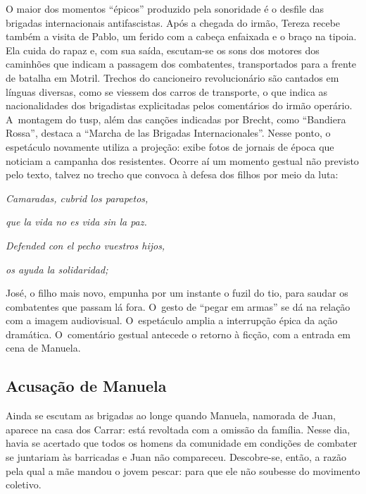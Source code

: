 O maior dos momentos “épicos” produzido pela sonoridade é o desfile das
brigadas internacionais antifascistas. Após a chegada do irmão, Tereza
recebe também a visita de Pablo, um ferido com a cabeça enfaixada e o
braço na tipoia. Ela cuida do rapaz e, com sua saída, escutam-se os sons
dos motores dos caminhões que indicam a passagem dos combatentes,
transportados para a frente de batalha em Motril. Trechos do cancioneiro
revolucionário são cantados em línguas diversas, como se viessem dos
carros de transporte, o que indica as nacionalidades dos brigadistas
explicitadas pelos comentários do irmão operário. A~montagem do {\sc tusp},
além das canções indicadas por Brecht, como “Bandiera Rossa”,
destaca a “Marcha de las Brigadas Internacionales”. Nesse ponto, o espetáculo
novamente utiliza a projeção: exibe fotos de jornais de época
que noticiam a campanha dos resistentes. Ocorre aí um momento gestual
não previsto pelo texto, talvez no trecho que convoca à defesa dos
filhos por meio da luta:

\startblockquote
{\it Camaradas, cubrid los parapetos,}

{\it que la vida no es vida sin la paz.}

{\it Defended con el pecho vuestros hijos,}

{\it os ayuda la solidaridad;}
\stopblockquote

José, o filho mais novo, empunha por um instante o fuzil do tio, para
saudar os combatentes que passam lá fora. O~gesto de “pegar em armas” se
dá na relação com a imagem audiovisual. O~espetáculo amplia a
interrupção épica da ação dramática. O~comentário gestual antecede o
retorno à ficção, com a entrada em cena de Manuela.



\page

\subsection{Acusação de Manuela}

Ainda se escutam as brigadas ao longe quando Manuela, namorada de Juan,
aparece na casa dos Carrar: está revoltada com a omissão da família.
Nesse dia, havia se acertado que todos os homens da comunidade em
condições de combater se juntariam às barricadas e Juan não compareceu.
Descobre-se, então, a razão pela qual a mãe mandou o jovem pescar:
para que ele não soubesse do movimento coletivo.

